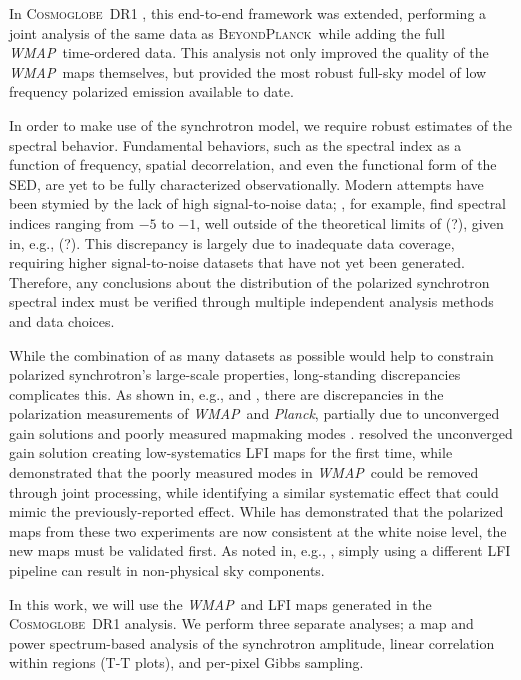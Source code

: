 \documentclass[twocolumn]{../../common/aa}
\def\WMAP{\emph{WMAP}}
\def\Planck{\emph{Planck}}
\newcommand{\bp}{\textsc{BeyondPlanck}}
\newcommand{\cosmoglobe}{\textsc{Cosmoglobe}}
\begin{document}
In \cosmoglobe\ DR1 \citep{watts2023_dr1}, this end-to-end framework was extended, performing a joint analysis of the same data as \bp\ while adding the full \WMAP\ time-ordered data. This analysis not only improved the quality of the \WMAP\ maps themselves, but provided the most robust full-sky model of low frequency polarized emission available to date.

In order to make use of the synchrotron model, we require robust estimates of the spectral behavior. Fundamental behaviors, such as the spectral index as a function of frequency, spatial decorrelation, and even the functional form of the SED, are yet to be fully characterized observationally. Modern attempts have been stymied by the lack of high signal-to-noise data; \citet{deBelsunce:2022}, for example, find spectral indices ranging from $-5$ to $-1$, well outside of the theoretical limits of (?), given in, e.g., (?). This discrepancy is largely due to inadequate data coverage, requiring higher signal-to-noise datasets that have not yet been generated. Therefore, any conclusions about the distribution of the polarized synchrotron spectral index must be verified through multiple independent analysis methods and data choices.


While the combination of as many datasets as possible would help to constrain polarized synchrotron's large-scale properties, long-standing discrepancies complicates this. As shown in, e.g., \citet{planck2014-a12} and \citet{weiland:2018}, there are discrepancies in the polarization measurements of \WMAP\ and \Planck, partially due to unconverged gain solutions \citep{planck2016-l02} and poorly measured mapmaking modes \citep{bennett2012}. \citet{bp01} resolved the unconverged gain solution creating low-systematics LFI maps for the first time, while \citet{bp17} demonstrated that the poorly measured modes in \WMAP\ could be removed through joint processing, while identifying a similar systematic effect that could mimic the previously-reported effect.  While \citet{watts2023_dr1} has demonstrated that the polarized maps from these two experiments are now consistent at the white noise level, the new maps must be validated first. As noted in, e.g., \citet{weiland:2022}, simply using a different LFI pipeline can result in non-physical sky components. 


In this work, we will use the \WMAP\ and LFI maps generated in the \cosmoglobe\ DR1 analysis. We perform three separate analyses; a map and power spectrum-based analysis of the synchrotron amplitude, linear correlation within regions (T-T plots), and per-pixel Gibbs sampling.
\end{document}
